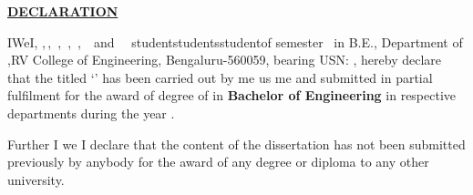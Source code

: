 
\thispagestyle{empty}
\vspace{-0.75cm}
\begin{center}
	\Large\textbf{\underline{DECLARATION}} \par
\end{center}


\begin{sloppypar}\noindent \ifPG I\else \ifStuNameBUsed We\else I\fi\fi, \textbf{\printStuNameA}\ifPG ,$\,$\else\ifStuNameBUsed\ifStuNameCUsed,$\,$ \fi \textbf{\printStuNameB}\ifStuNameCUsed \ifStuNameDUsed,$\,$ \fi \textbf{\printStuNameC}\ifStuNameDUsed\ifIDP,$\,$ \fi  \textbf{\printStuNameD}\ifIDP\ifStuNameEUsed\ifStuNameFUsed,$\,$ \fi \textbf{\printStuNameE}$\,$ \ifStuNameFUsed and $\,$ \textbf{\printStuNameF}$\,$ \fi\fi\fi\fi\fi\fi\fi \ifPG student\space \else \ifStuNameBUsed\space students\space\else\space student\space\fi\fi of \ifPG {} \fi\else{}\else{}\else {}\fi\fi\fi\fi\space semester \ifPG \printMastersInSF\, in \printMastersPrgName \else B.E.\fi, \ifIDP \else Department of \printDepartmentLF,\fi\space RV College of Engineering, Bengaluru-560059, bearing USN: \textbf{\printStuUSNA}, hereby declare that the  \else {} \else {}\fi\fi\fi titled `\textbf{\printTitle}' has been carried out by \ifPG me \else \ifStuNameBUsed us \else me \fi\fi and submitted in partial fulfilment for the award of degree of \ifPG \textbf{\printMastersInLF} in \textbf{\printMastersPrgName} \else\textbf{Bachelor of Engineering} in \ifIDP respective departments \else  \textbf{\printDepartmentLF} \fi\fi during the year \printAcadYear.\end{sloppypar}

\noindent Further \ifPG I \else\ifStuNameBUsed we \else I \fi \fi declare that the content of the dissertation has not been submitted previously by anybody for the award of any degree or diploma to any other university.\\ \par


